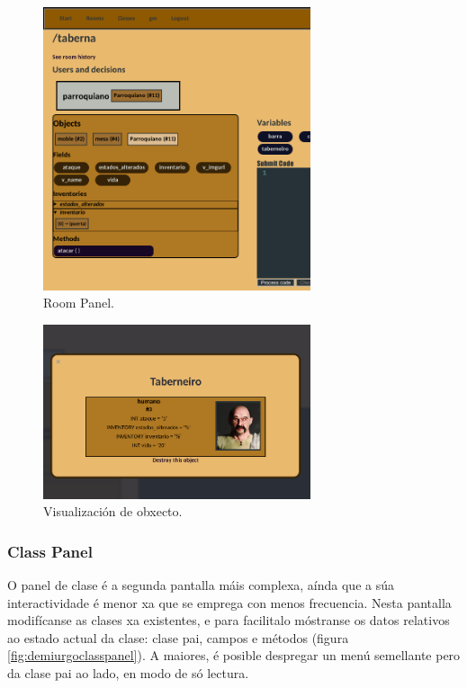 \begin{figure}
\centerline{\includegraphics[width=0.7\textwidth]{figuras/demiurgo_roompanel.png}}
\caption{Room Panel.}
\label{fig:demiurgoroompanel}
\end{figure}


\begin{figure}
\centerline{\includegraphics[width=0.7\textwidth]{figuras/demiurgo_object.png}}
\caption{Visualización de obxecto.}
\label{fig:demiurgoobject}
\end{figure}

\subsubsection{Class Panel}
O panel de clase é a segunda pantalla máis complexa, aínda que a súa
interactividade é menor xa que se emprega con menos frecuencia. Nesta pantalla
modifícanse as clases xa existentes, e para facilitalo móstranse os datos
relativos ao estado actual da clase: clase pai, campos e métodos (figura
\ref{fig:demiurgoclasspanel}). A maiores, é posible despregar un menú semellante
pero da clase pai ao lado, en modo de só lectura.

